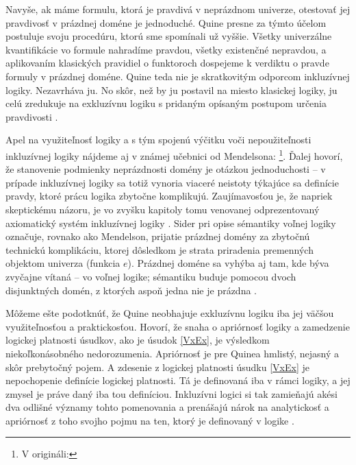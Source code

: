 \documentclass[12pt, letterpaper]{article}
\begin{document}
Navyše, ak máme formulu, ktorá je pravdivá v neprázdnom univerze, otestovať jej pravdivosť v prázdnej doméne je jednoduché. Quine presne za týmto účelom postuluje svoju procedúru, ktorú sme spomínali už vyššie. Všetky univerzálne kvantifikácie vo formule nahradíme pravdou, všetky existenčné nepravdou, a aplikovaním klasických pravidiel o funktoroch dospejeme k verdiktu o pravde formuly v prázdnej doméne. Quine teda nie je skratkovitým odporcom inkluzívnej logiky. Nezavrháva ju. No skôr, než by ju postavil na miesto klasickej logiky, ju celú zredukuje na exkluzívnu logiku s pridaným opísaným postupom určenia pravdivosti \parencites[177]{quine_quantification_1954}.\par
Apel na využiteľnosť logiky a s tým spojenú výčitku voči nepoužiteľnosti inkluzívnej logiky nájdeme aj v známej učebnici od Mendelsona: \footnote{V origináli: }\parencites[146]{mendelson_introduction_2015}. Ďalej hovorí, že stanovenie podmienky neprázdnosti domény je otázkou jednoduchosti -- v prípade inkluzívnej logiky sa totiž vynoria viaceré neistoty týkajúce sa definície pravdy, ktoré prácu logika zbytočne komplikujú. Zaujímavosťou je, že napriek skeptickému názoru, je vo zvyšku kapitoly tomu venovanej odprezentovaný axiomatický systém inkluzívnej logiky \parencites[146--152]{mendelson_introduction_2015}. Sider pri opise sémantiky voľnej logiky označuje, rovnako ako Mendelson, prijatie prázdnej domény za zbytočnú technickú komplikáciu, ktorej dôsledkom je strata priradenia premenných objektom univerza (funkcia $e$). Prázdnej doméne sa vyhýba aj tam, kde býva zvyčajne vítaná -- vo voľnej logike; sémantiku buduje pomocou dvoch disjunktných domén, z ktorých aspoň jedna nie je prázdna \parencites[166--167]{Sider2009}.\par
Môžeme ešte podotknúť, že Quine neobhajuje exkluzívnu logiku iba jej väčšou využiteľnosťou a praktickosťou. Hovorí, že snaha o apriórnosť logiky a zamedzenie logickej platnosti úsudkov, ako je úsudok \ref{VxEx}, je výsledkom niekoľkonásobného nedorozumenia. Apriórnosť je pre Quinea hmlistý, nejasný a skôr prebytočný pojem. A zdesenie z logickej platnosti úsudku \ref{VxEx} je nepochopenie definície logickej platnosti. Tá je definovaná iba v rámci logiky, a jej zmysel je práve daný iba tou definíciou. Inkluzívni logici si tak zamieňajú akési dva odlišné významy tohto pomenovania a prenášajú nárok na analytickosť a apriórnosť z toho svojho pojmu na ten, ktorý je definovaný v logike \parencites[160--161]{QuineLPV}. \par
\end{document}
